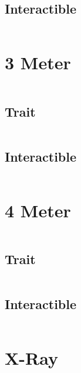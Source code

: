 \documentclass[main.tex]{subfiles}
\begin{document}
\begin{lstlisting}[language=FG]
\end{lstlisting}


\subsection{Interactible}
\begin{lstlisting}[language=FG]

\end{lstlisting}

\section{3 Meter}


\begin{lstlisting}[language=FG]
\end{lstlisting}

\subsection{Trait}

\begin{lstlisting}[language=FG]
\end{lstlisting}


\subsection{Interactible}
\begin{lstlisting}[language=FG]

\end{lstlisting}
\section{4 Meter}

\begin{lstlisting}[language=FG]
\end{lstlisting}

\subsection{Trait}

\begin{lstlisting}[language=FG]
\end{lstlisting}


\subsection{Interactible}
\begin{lstlisting}[language=FG]

\end{lstlisting}

\section{X-Ray}
\end{document}

